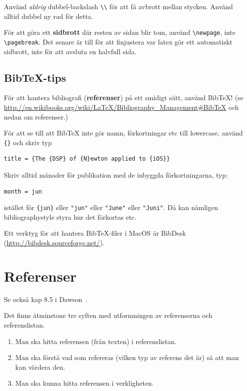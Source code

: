 \documentclass[swedish, a4paper,12pt]{article}
\begin{document}
Använd \emph{aldrig} dubbel-backslash \verb|\\| för att få avbrott mellan stycken. Använd alltid dubbel ny rad för detta.

För att göra ett \textbf{sidbrott} där resten av sidan blir tom, använd \verb|\newpage|, inte \verb|\pagebreak|. Det senare är till för att finjustera var latex gör ett automatiskt sidbrott, inte för att avsluta en halvfull sida.

\subsection{Bib\TeX-tips}

För att hantera bibliografi (\textbf{referenser}) på ett smidigt sätt, använd BibTeX! (se \url{http://en.wikibooks.org/wiki/LaTeX/Bibliography_Management#BibTeX} och nedan om referenser.)

För att se till att BibTeX inte gör namn, förkortningar etc till lowercase, använd \verb|{}| och skriv typ
\begin{verbatim}
title = {The {DSP} of {N}ewton applied to {iOS}}
\end{verbatim}

Skriv alltid månader för publikation med de inbyggda förkortningarna, typ:
\begin{verbatim}
month = jun
\end{verbatim}
istället för \verb|{jun}| eller \verb|"jun"| eller \verb|"June"| eller \verb|"Juni"|. Då kan nämligen bibliographystyle styra hur det förkortas etc.

Ett verktyg för att hantera BibTeX-filer i MacOS är BibDesk (\url{http://bibdesk.sourceforge.net/}).


\section{Referenser}
\label{sec:referenser}

Se också kap 8.5 i Dawson~\cite{dawson:projects-in-computing}.

Det finns åtminstone tre syften med utformningen av referenserna och referenslistan.
\begin{enumerate}
\item Man ska hitta referensen (från texten) i referenslistan.
\item Man ska förstå vad som refereras (vilken typ av referens det är) så att man kan värdera den.
\item Man ska kunna hitta referensen i verkligheten.
\end{enumerate}
\end{document}
